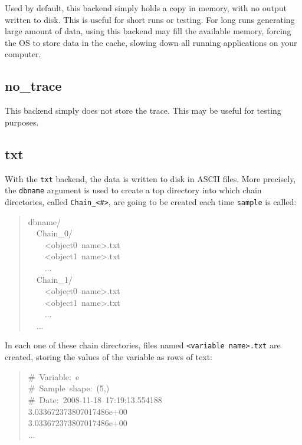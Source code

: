 Used by default, this backend simply holds a copy in memory, with no output 
written to disk. This is useful for short runs or testing. For long runs 
generating large amount of data, using this backend may fill the available 
memory, forcing the OS to store data in the cache, slowing down all running 
applications on your computer.



\hypertarget{no-trace}{}
\subsection*{no{\_}trace}

This backend simply does not store the trace. This may be useful for testing
purposes.



\hypertarget{txt}{}
\subsection*{txt}

With the \texttt{txt} backend, the data is written to disk in ASCII files. 
More precisely, the \texttt{dbname} argument is used to create a top directory 
into which chain directories, called \texttt{Chain{\_}<{\#}>}, are going to be created each 
time \texttt{sample} is called:
\begin{quote}{\ttfamily \raggedright \noindent
dbname/~\\
~~Chain{\_}0/~\\
~~~~<object0~name>.txt~\\
~~~~<object1~name>.txt~\\
~~~~...~\\
~~Chain{\_}1/~\\
~~~~<object0~name>.txt~\\
~~~~<object1~name>.txt~\\
~~~~...~\\
~~...
}\end{quote}

In each one of these chain directories, files named \texttt{<variable name>.txt} 
are created, storing the values of the variable as rows of text:
\begin{quote}{\ttfamily \raggedright \noindent
{\#}~Variable:~e~\\
{\#}~Sample~shape:~(5,)~\\
{\#}~Date:~2008-11-18~17:19:13.554188~\\
3.033672373807017486e+00~\\
3.033672373807017486e+00~\\
...
}\end{quote}

